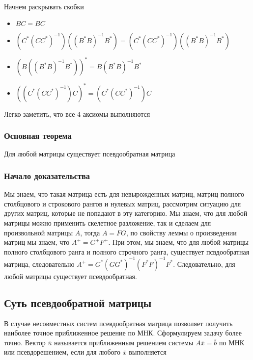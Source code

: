 \documentclass{article}
\begin{document}
    Начнем раскрывать скобки

    \begin{itemize}
        \item $B C = BC$
        \item $(C^{*} (C C ^{*})^{-1})  ( (B^{*} B)^{-1} B^{*}) = (C^{*} (C C ^{*})^{-1})( (B^{*} B)^{-1} B^{*})$
        \item $(B ((B^{*} B)^{-1} B^{*}))^{*} = B (B^{*} B)^{-1} B^{*}$
        \item $((C^{*} (C C ^{*})^{-1}) C)^{*} = (C^{*} (C C ^{*})^{-1}) C$
    \end{itemize}

    Легко заметить, что все 4 аксиомы выполняются

    \subsubsection{Основная теорема}

    Для любой матрицы существует псевдообратная матрица

    \quad

    \subsubsection{Начало доказательства}

    \quad

    Мы знаем, что такая матрица есть для невырожденных матриц,
    матриц полного столбцового и строкового рангов и нулевых матриц,
    рассмотрим ситуацию для других матриц, которые не попадают в эту категорию.
    Мы знаем, что для любой матрицы можно применить скелетное разложение, так и сделаем для произвольной матрицы
    $A$, тогда $A = FG$, по свойству леммы о произведении матриц мы знаем, что $A^{+} = G^{+} F^{+}$.
    При этом, мы знаем, что для любой матрицы полного столбцового ранга и полного строчного ранга, существует псвдообратная матрица,
    следовательно $A^{+} = G^{*} (G G ^{*})^{-1} (F^{*} F)^{-1} F ^{*}$.
    Следовательно, для любой матрицы существует псевдообратная.
    
    \subsection{Суть псевдообратной матрицы}

    В случае несовместных систем псевдообратная матрица позволяет получить наиболее точное приближенное решение по МНК.
    Сформулируем задачу более точно.
    Вектор $\bar{u}$ называется приближенным решением системы $A \bar{x} = \bar{b}$ по МНК или псевдорешением, если для любого $\bar{x}$ выполняется
\end{document}
